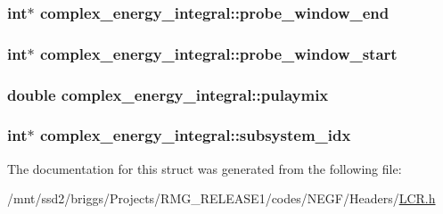 \hypertarget{structcomplex__energy__integral_af18c3646334b84ce3643eb27c94af1f3}{
\subsubsection[{probe\-\_\-window\-\_\-end}]{\setlength{\rightskip}{0pt plus 5cm}int$\ast$ complex\-\_\-energy\-\_\-integral\-::probe\-\_\-window\-\_\-end}}\label{structcomplex__energy__integral_af18c3646334b84ce3643eb27c94af1f3}
\hypertarget{structcomplex__energy__integral_aed1bde009aa6ebcc1894c473b91f6054}{
\subsubsection[{probe\-\_\-window\-\_\-start}]{\setlength{\rightskip}{0pt plus 5cm}int$\ast$ complex\-\_\-energy\-\_\-integral\-::probe\-\_\-window\-\_\-start}}\label{structcomplex__energy__integral_aed1bde009aa6ebcc1894c473b91f6054}
\hypertarget{structcomplex__energy__integral_a311a80abee109c317375a3ee75824cac}{
\subsubsection[{pulaymix}]{\setlength{\rightskip}{0pt plus 5cm}double complex\-\_\-energy\-\_\-integral\-::pulaymix}}\label{structcomplex__energy__integral_a311a80abee109c317375a3ee75824cac}
\hypertarget{structcomplex__energy__integral_a42ffc2d38bbc333454bccf47a207e0ec}{
\subsubsection[{subsystem\-\_\-idx}]{\setlength{\rightskip}{0pt plus 5cm}int$\ast$ complex\-\_\-energy\-\_\-integral\-::subsystem\-\_\-idx}}\label{structcomplex__energy__integral_a42ffc2d38bbc333454bccf47a207e0ec}


The documentation for this struct was generated from the following file\-:\begin{DoxyCompactItemize}
\item 
/mnt/ssd2/briggs/\-Projects/\-R\-M\-G\-\_\-\-R\-E\-L\-E\-A\-S\-E1/codes/\-N\-E\-G\-F/\-Headers/\hyperlink{_l_c_r_8h}{L\-C\-R.\-h}\end{DoxyCompactItemize}
